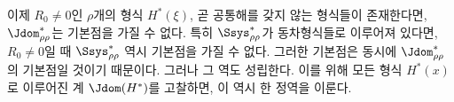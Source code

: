 
이제 $R_0\ne0$인 $\rho$개의 형식 $H^*(\xi)$, 곧 공통해를 갖지 않는 형식들이 존재한다면, $\Jdom^*_{\rho\rho}$는 기본점을 가질 수 없다. 특히 $\Ssys^*_{\rho\rho}$가 동차형식들로 이루어져 있다면, $R_0\ne0$일 때 $\Ssys^*_{\rho\rho}$ 역시 기본점을 가질 수 없다. 그러한 기본점은 동시에 $\Jdom^*_{\rho\rho}$의 기본점일 것이기 때문이다. 그러나 그 역도 성립한다. 이를 위해 모든 형식 $H^*(x)$로 이루어진 계 $\Jdom(H^*)$를 고찰하면, 이 역시 한 정역을 이룬다.

